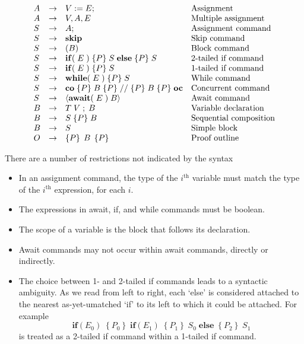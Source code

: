 \documentclass[11pt]{article}%
\begin{document}
\[%
\begin{array}
[t]{llll}%
A & \rightarrow & V:=E; & \text{Assignment}\\
A & \rightarrow & V,A,E & \text{Multiple assignment}\\
S & \rightarrow & A; & \text{Assignment command}\\
S & \rightarrow & \mathbf{skip} & \text{Skip command}\\
S & \rightarrow & (B) & \text{Block command}\\
S & \rightarrow & \mathbf{if}(\;E\;)\;\{P\}\;S\;\mathbf{else}\;\{P\}\;S &
\text{2-tailed if command}\\
S & \rightarrow & \mathbf{if}(\;E\;)\;\{P\}\;S & \text{1-tailed if command}\\
S & \rightarrow & \mathbf{while}(\;E\;)\;\{P\}\;S & \text{While command}\\
S & \rightarrow & \mathbf{co}%
\;\{P\}\;B\;\{P\}\;//\;\{P\}\;B\;\{P\}\;\mathbf{oc} & \text{Concurrent
command}\\
S & \rightarrow & \left\langle \mathbf{await}(\;E\;)\;B\right\rangle  &
\text{Await command}\\
B & \rightarrow & T\;V\;;\;B & \text{Variable declaration}\\
B & \rightarrow & S\;\{P\}\;B & \text{Sequential composition}\\
B & \rightarrow & S & \text{Simple block}\\
O & \rightarrow & \left\{  P\right\}  \;B\;\left\{  P\right\}  & \text{Proof
outline}%
\end{array}
\]


There are a number of restrictions not indicated by the syntax

\begin{itemize}
\item In an assignment command, the type of the $i^{\text{th}}$ variable must
match the type of the $i^{\text{th}}$ expression, for each $i$.

\item The expressions in await, if, and while commands must be boolean.

\item The scope of a variable is the block that follows its declaration.

\item Await commands may not occur within await commands, directly or indirectly.

\item The choice between 1- and 2-tailed if commands leads to a syntactic
ambiguity. As we read from left to right, each `else' is considered attached
to the nearest as-yet-umatched `if' to its left to which it could be attached.
For example
\[
\mathbf{if}(E_{0})\;\left\{  P_{0}\right\}  \;\mathbf{if}(E_{1})\;\left\{
P_{1}\right\}  \;S_{0}\;\mathbf{else}\;\left\{  P_{2}\right\}  \;S_{1}%
\]
is treated as a 2-tailed if command within a 1-tailed if command.
\end{itemize}
\end{document}
